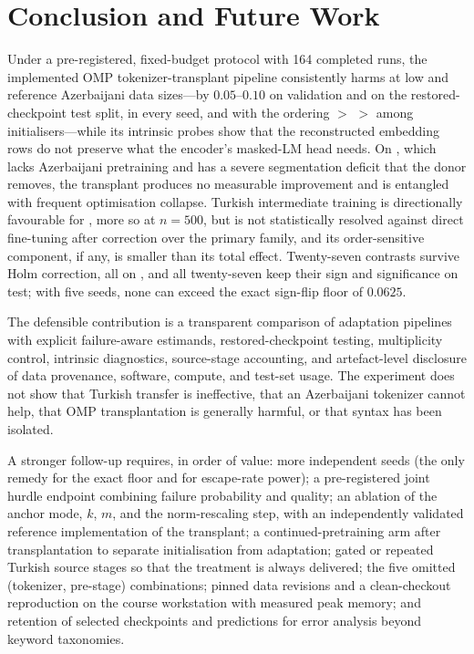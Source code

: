 \section{Conclusion and Future Work}
\label{sec:conclusion}
Under a pre-registered, fixed-budget protocol with 164 completed runs, the implemented OMP tokenizer-transplant pipeline consistently harms \xlmr{} at low and reference Azerbaijani data sizes---by $0.05$–$0.10$ \Fone{} on validation and on the restored-checkpoint test split, in every seed, and with the ordering \Mean{} $>$ \OMP{} $>$ \Random{} among initialisers---while its intrinsic probes show that the reconstructed embedding rows do not preserve what the encoder's masked-LM head needs. On \xlmxv{}, which lacks Azerbaijani pretraining and has a severe segmentation deficit that the donor removes, the transplant produces no measurable improvement and is entangled with frequent optimisation collapse. Turkish intermediate training is directionally favourable for \xlmr{}, more so at $n=500$, but is not statistically resolved against direct fine-tuning after correction over the primary family, and its order-sensitive component, if any, is smaller than its total effect. Twenty-seven contrasts survive Holm correction, all on \xlmr{}, and all twenty-seven keep their sign and significance on test; with five seeds, none can exceed the exact sign-flip floor of $0.0625$.

The defensible contribution is a transparent comparison of adaptation pipelines with explicit failure-aware estimands, restored-checkpoint testing, multiplicity control, intrinsic diagnostics, source-stage accounting, and artefact-level disclosure of data provenance, software, compute, and test-set usage. The experiment does not show that Turkish transfer is ineffective, that an Azerbaijani tokenizer cannot help, that OMP transplantation is generally harmful, or that syntax has been isolated.

A stronger follow-up requires, in order of value: more independent seeds (the only remedy for the exact floor and for escape-rate power); a pre-registered joint hurdle endpoint combining failure probability and quality; an ablation of the anchor mode, $k$, $m$, and the norm-rescaling step, with an independently validated reference implementation of the transplant; a continued-pretraining arm after transplantation to separate initialisation from adaptation; gated or repeated Turkish source stages so that the treatment is always delivered; the five omitted (tokenizer, pre-stage) combinations; pinned data revisions and a clean-checkout reproduction on the course workstation with measured peak memory; and retention of selected checkpoints and predictions for error analysis beyond keyword taxonomies.
